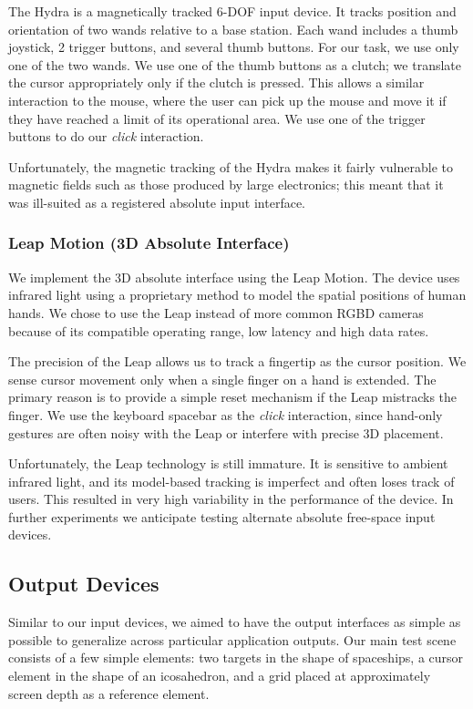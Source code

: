The Hydra is a magnetically tracked 6-DOF input device. It tracks position and
orientation of two wands relative to a base station. Each wand includes a thumb
joystick, 2 trigger buttons, and several thumb buttons. For our task, we use
only one of the two wands. We use one of the thumb buttons as a clutch; we
translate the cursor appropriately only if the clutch is pressed. This allows a
similar interaction to the mouse, where the user can pick up the mouse and move
it if they have reached a limit of its operational area. We use one of the
trigger buttons to do our {\it click} interaction.

Unfortunately, the magnetic tracking of the Hydra makes it fairly vulnerable to
magnetic fields such as those produced by large electronics; this meant that it
was ill-suited as a registered absolute input interface.

\subsubsection{Leap Motion (3D Absolute Interface)}
We implement the 3D absolute interface using the Leap Motion. The device uses
infrared light using a proprietary method to model the spatial positions of
human hands. We chose to use the Leap instead of more common RGBD cameras
because of its compatible operating range, low latency and high data rates.

The precision of the Leap allows us to track a fingertip as the cursor
position.  We sense cursor movement only when a single finger on a hand is
extended. The primary reason is to provide a simple reset mechanism if the
Leap mistracks the finger.  We use the keyboard spacebar as the {\it click}
interaction, since hand-only gestures are often noisy with the Leap or
interfere with precise 3D placement.

Unfortunately, the Leap technology is still immature. It is sensitive to
ambient infrared light, and its model-based tracking is imperfect and often
loses track of users. This resulted in very high variability in the
performance of the device. In further experiments we anticipate testing
alternate absolute free-space input devices.

\subsection{Output Devices}
Similar to our input devices, we aimed to have the output interfaces as simple
as possible to generalize across particular application outputs. Our main test
scene consists of a few simple elements: two targets in the shape of
spaceships, a cursor element in the shape of an icosahedron, and a grid placed
at approximately screen depth as a reference element.

